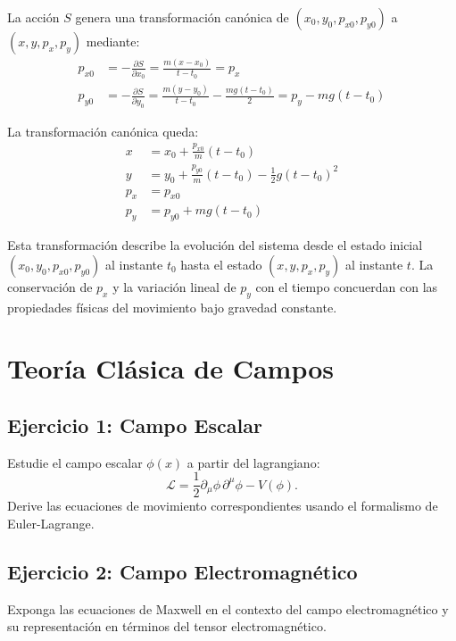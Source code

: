 \documentclass[12pt]{article}
\begin{document}
\begin{enumerate}
  La acción $S$ genera una transformación canónica de $(x_0,y_0,p_{x0},p_{y0})$ a $(x,y,p_x,p_y)$ mediante:
  \begin{align}
  p_{x0} &= -\frac{\partial S}{\partial x_0} = \frac{m(x-x_0)}{t-t_0} = p_x \\
  p_{y0} &= -\frac{\partial S}{\partial y_0} = \frac{m(y-y_0)}{t-t_0} - \frac{mg(t-t_0)}{2} = p_y - mg(t-t_0)
  \end{align}

  La transformación canónica queda:
  \begin{align}
  x &= x_0 + \frac{p_{x0}}{m}(t-t_0) \\
  y &= y_0 + \frac{p_{y0}}{m}(t-t_0) - \frac{1}{2}g(t-t_0)^2 \\
  p_x &= p_{x0} \\
  p_y &= p_{y0} + mg(t-t_0)
  \end{align}

  Esta transformación describe la evolución del sistema desde el estado inicial $(x_0,y_0,p_{x0},p_{y0})$ al instante $t_0$ hasta el estado $(x,y,p_x,p_y)$ al instante $t$. La conservación de $p_x$ y la variación lineal de $p_y$ con el tiempo concuerdan con las propiedades físicas del movimiento bajo gravedad constante.
\end{enumerate}


\section{Teoría Clásica de Campos}
\subsection{Ejercicio 1: Campo Escalar}
Estudie el campo escalar \(\phi(x)\) a partir del lagrangiano:
\[
\mathcal{L} = \frac{1}{2}\partial_\mu\phi\,\partial^\mu\phi - V(\phi).
\]
Derive las ecuaciones de movimiento correspondientes usando el formalismo de Euler-Lagrange.

\subsection{Ejercicio 2: Campo Electromagnético}
Exponga las ecuaciones de Maxwell en el contexto del campo electromagnético y su representación en términos del tensor electromagnético.
\end{document}
